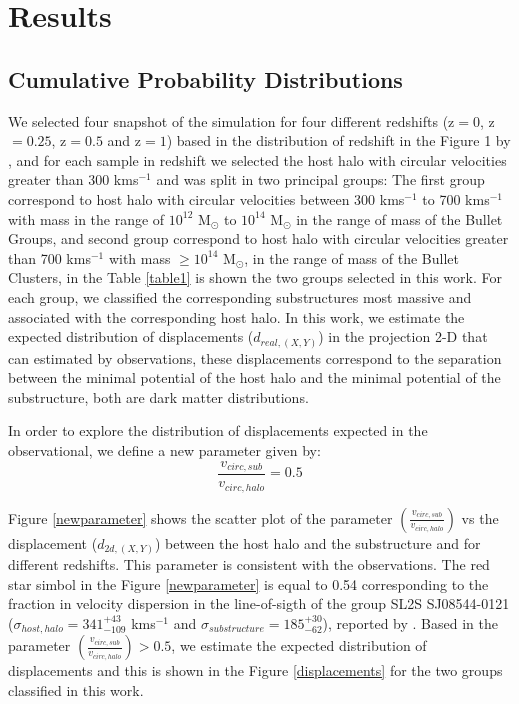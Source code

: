 \documentclass{emulateapj}
\begin{document}
\section{Results}
\label{sec:results}

\subsection{Cumulative Probability Distributions}
\label{cumulative_distribution}

We selected four snapshot of the simulation for four different
redshifts (z$=0$, z$=0.25$, z$=0.5$ and z$=1$) based in the
distribution of redshift in the Figure 1 by \citet{verdugo}, and  for
each sample in redshift we selected the host halo with circular
velocities greater than 300 kms$^{-1}$ and was split in two  principal
groups: The first group correspond to host halo with circular
velocities between 300 kms$^{-1}$ to 700 kms${^{-1}}$ with mass in the
range of $10^{12}$ M$_\odot{}$ to $10^{14}$ M$_\odot{}$ in the range
of mass of the Bullet Groups, and second group correspond to host halo
with circular velocities greater than 700 kms$^{-1}$ with mass
$\geq10^{14}$ M$_\odot{}$, in the range of mass of the Bullet
Clusters, in  the Table \ref{table1} is shown the two groups selected
in this work. For each group, we  classified the corresponding
substructures most massive and associated with the corresponding host
halo.  In  this work,
we estimate the expected distribution of displacements
($d_{real,(X,Y)}$) in the projection 2-D that can estimated by
observations, these displacements correspond to the separation between
the minimal potential of the host halo and the  minimal potential of
the substructure, both are dark matter distributions. 



In order to explore the distribution of displacements expected in the observational, we define a new parameter given by:\\

\begin{equation}
 \frac{v_{circ,sub}}{v_{circ,halo}}=0.5
\end{equation}
 

Figure \ref{newparameter} shows the scatter plot of the parameter $\left(\frac{v_{circ,sub}}{v_{circ,halo}}\right)$ vs the 
displacement ($d_{2d,(X,Y)}$) between the host halo and the substructure and for different redshifts. This parameter is 
consistent with the observations. The red star simbol in the Figure \ref{newparameter} is equal to 0.54 corresponding to 
the fraction in velocity dispersion in the line-of-sigth of the group SL2S SJ08544-0121 ($\sigma_{host,halo}=341^{+43}_{-109}$ kms$^{-1}$ and $\sigma_{substructure}=185^{+30}_{-62}$), reported by \citet{2013A&A...552A..80M}.
Based in the parameter $\left(\frac{v_{circ,sub}}{v_{circ,halo}}\right)>0.5$, we estimate the expected distribution of
displacements and this is shown in the Figure \ref{displacements} for the two groups classified in this work.
 
\end{document}
